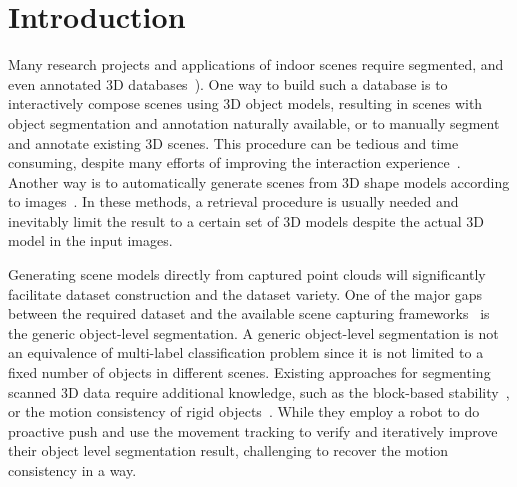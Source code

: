 \section{Introduction}
\label{sec:intro}
 
Many research projects and applications of indoor scenes require segmented, and even annotated 3D databases~\cite{SearchClassify,SceneFromExample,Fisher:2012:ESO:2366145.2366154,Chen:2014:ASM:2661229.2661239,Fisher:ActivityCentricSceneSynthesis}).
%
One way to build such a database is to interactively compose scenes using 3D object models, resulting in scenes with object segmentation and annotation naturally available, or to manually segment and annotate existing 3D scenes. 
%
This procedure can be tedious and time consuming, despite many efforts of improving the interaction experience~\cite{Merrell:2011:IFL:2010324.1964982, Xu:2013:SSC:2461912.2461968}.
%
Another way is to automatically generate scenes from 3D shape models according to images~\cite{Liu2015Model,Chen:2014:ASM:2661229.2661239}. 
%
In these methods, a retrieval procedure is usually needed and inevitably limit the result to a certain set of 3D models despite the actual 3D model in the input images.

Generating scene models directly from captured point clouds will significantly facilitate dataset construction and  the dataset variety.
%
One of the major gaps between the required dataset and the available scene capturing frameworks~\cite{KinectFusion, dai2016bundlefusion} is the generic object-level segmentation. 
%
A generic object-level segmentation is not an equivalence of multi-label classification problem since it is not limited to a fixed number of objects in different scenes. 
%
Existing approaches for segmenting scanned 3D data require additional knowledge, such as the block-based stability~\cite{3DReasoningfromBlockstoStability}, or the motion consistency of rigid objects~\cite{Xu:2015:ACS:2816795.2818075}.  
%
%
While they employ a robot to do proactive push and use the movement tracking to verify and iteratively improve their object level segmentation result,  challenging to recover the motion consistency in a  way.


